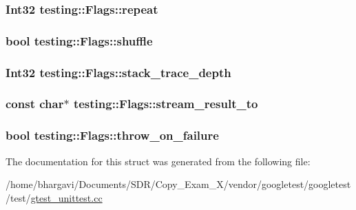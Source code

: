 \subsubsection[{\texorpdfstring{repeat}{repeat}}]{\setlength{\rightskip}{0pt plus 5cm}Int32 testing\+::\+Flags\+::repeat}\hypertarget{structtesting_1_1_flags_a61614dd07f97f6e04d27c004ff15195e}{}\label{structtesting_1_1_flags_a61614dd07f97f6e04d27c004ff15195e}
\subsubsection[{\texorpdfstring{shuffle}{shuffle}}]{\setlength{\rightskip}{0pt plus 5cm}bool testing\+::\+Flags\+::shuffle}\hypertarget{structtesting_1_1_flags_a51c689e47e0f55c16116ac2a1d3b05d6}{}\label{structtesting_1_1_flags_a51c689e47e0f55c16116ac2a1d3b05d6}
\subsubsection[{\texorpdfstring{stack\+\_\+trace\+\_\+depth}{stack_trace_depth}}]{\setlength{\rightskip}{0pt plus 5cm}Int32 testing\+::\+Flags\+::stack\+\_\+trace\+\_\+depth}\hypertarget{structtesting_1_1_flags_a20c6592453909c1adace64bf6a2bc2de}{}\label{structtesting_1_1_flags_a20c6592453909c1adace64bf6a2bc2de}
\subsubsection[{\texorpdfstring{stream\+\_\+result\+\_\+to}{stream_result_to}}]{\setlength{\rightskip}{0pt plus 5cm}const char$\ast$ testing\+::\+Flags\+::stream\+\_\+result\+\_\+to}\hypertarget{structtesting_1_1_flags_ab09849fd3e095d5628dec65ec4dce9e1}{}\label{structtesting_1_1_flags_ab09849fd3e095d5628dec65ec4dce9e1}
\subsubsection[{\texorpdfstring{throw\+\_\+on\+\_\+failure}{throw_on_failure}}]{\setlength{\rightskip}{0pt plus 5cm}bool testing\+::\+Flags\+::throw\+\_\+on\+\_\+failure}\hypertarget{structtesting_1_1_flags_ab8e7d21e31e641efe47b8050759e001a}{}\label{structtesting_1_1_flags_ab8e7d21e31e641efe47b8050759e001a}


The documentation for this struct was generated from the following file\+:\begin{DoxyCompactItemize}
\item 
/home/bhargavi/\+Documents/\+S\+D\+R/\+Copy\+\_\+\+Exam\+\_\+X/vendor/googletest/googletest/test/\hyperlink{gtest__unittest_8cc}{gtest\+\_\+unittest.\+cc}\end{DoxyCompactItemize}
